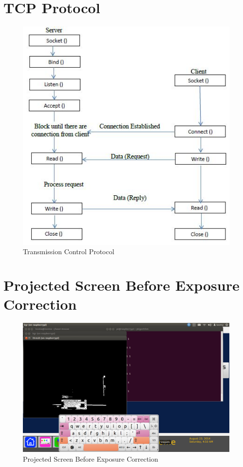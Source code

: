 \documentclass[12pt, a4paper]{article}
\begin{document}
\begin{appendices}
\section{TCP Protocol}
\begin{figure}[htp]
\centering
\includegraphics[scale=1.00]{tcp.png}
\caption{Transmission Control Protocol}
\label{}
\end{figure}

\newpage
\section{Projected Screen Before Exposure Correction}
\begin{figure}[htp]
\includegraphics[scale=0.30]{projector.png}
\caption{Projected Screen Before Exposure Correction}
\label{}
\end{figure}
\newpage


\end{appendices}
\end{document}
